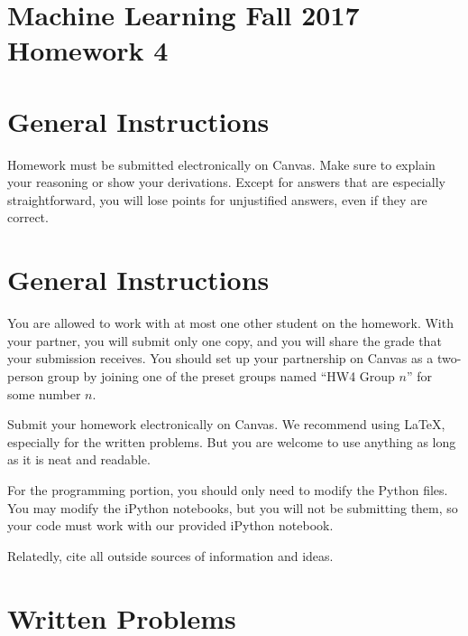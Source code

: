 \documentclass[10pt]{article}
\begin{document}
\section*{Machine Learning Fall 2017 Homework 4}

\section*{General Instructions}

Homework must be submitted electronically on Canvas. Make sure to explain your reasoning or show your derivations. Except for answers that are especially straightforward, you will lose points for unjustified answers, even if they are correct. 

\section*{General Instructions}

You are allowed to work with at most one other student on the homework. With your partner, you will submit only one copy, and you will share the grade that your submission receives. You should set up your partnership on Canvas as a two-person group by joining one of the preset groups named ``HW4 Group $n$'' for some number $n$.

Submit your homework electronically on Canvas. We recommend using LaTeX, especially for the written problems. But you are welcome to use anything as long as it is neat and readable. 

For the programming portion, you should only need to modify the Python files. You may modify the iPython notebooks, but you will not be submitting them, so your code must work with our provided iPython notebook.

Relatedly, cite all outside sources of information and ideas. 

\section*{Written Problems}
\end{document}
